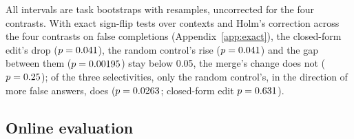 All intervals are task bootstraps with \pwBootReps{} resamples, uncorrected for the four contrasts. With exact sign-flip tests over contexts and Holm's correction across the four contrasts on false completions (Appendix~\ref{app:exact}), the closed-form edit's drop ($p=0.041$), the random control's rise ($p=0.041$) and the gap between them ($p=0.00195$) stay below 0.05, the merge's change does not ($p=0.25$); of the three selectivities, only the random control's, in the direction of more false answers, does ($p=0.0263$; closed-form edit $p=0.631$).

\subsection{Online evaluation}
\label{sec:online}
